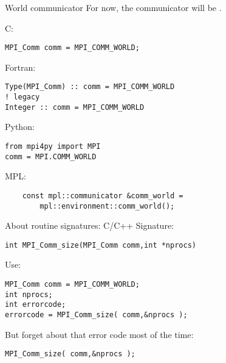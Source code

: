 \begin{numberedframe}{World communicator}
  \label{sl:mpi-comm-world}
  For now, the communicator will be .

  C:
  \lstset{language=C}
\begin{lstlisting}[numbers=none]
MPI_Comm comm = MPI_COMM_WORLD;
\end{lstlisting}

  Fortran:
  \lstset{language=Fortran}
\begin{lstlisting}[numbers=none]
Type(MPI_Comm) :: comm = MPI_COMM_WORLD
! legacy
Integer :: comm = MPI_COMM_WORLD
\end{lstlisting}

  Python:
  \lstset{language=Python}
\begin{lstlisting}
from mpi4py import MPI
comm = MPI.COMM_WORLD
\end{lstlisting}

  MPL:
  \lstset{language=C++}
\begin{lstlisting}
    const mpl::communicator &comm_world =
        mpl::environment::comm_world();
\end{lstlisting}
\end{numberedframe}


\begin{numberedframe}{About routine signatures: C/C++}
  \label{sec:protos}
Signature:
\lstset{language=C}
\begin{lstlisting}[numbers=none]
int MPI_Comm_size(MPI_Comm comm,int *nprocs)
\end{lstlisting}
Use:
\lstset{language=C}
\begin{lstlisting}
MPI_Comm comm = MPI_COMM_WORLD;
int nprocs;
int errorcode;
errorcode = MPI_Comm_size( comm,&nprocs );
\end{lstlisting}
But forget about that error code most of the time:
\begin{lstlisting}[numbers=none]
MPI_Comm_size( comm,&nprocs );
\end{lstlisting}
\end{numberedframe}

